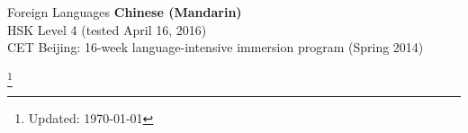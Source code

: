 \documentclass{resume} %
\newcommand\blfootnote[1]{%
  \begingroup
  \renewcommand\thefootnote{}\footnote{#1}%
  \addtocounter{footnote}{-1}%
  \endgroup
}
\begin{document}

\begin{rSection}{Foreign Languages}
\textbf{Chinese (Mandarin)} \\
HSK Level 4 (tested April 16, 2016) \\
CET Beijing: 16-week language-intensive immersion program (Spring 2014)
\end{rSection}

\blfootnote{Updated: \today}
\end{document}
